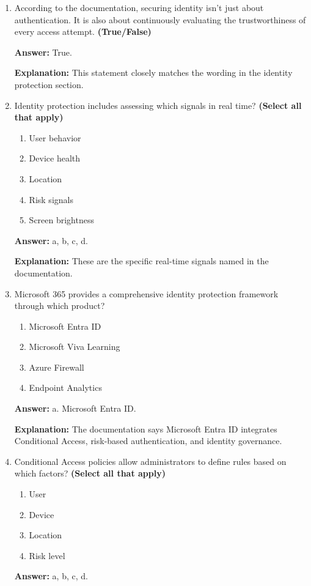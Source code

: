 \documentclass[10pt]{article}
\begin{document}
\begin{enumerate}[leftmargin=*]
\textbf{Explanation:} The documentation says early identity protection lays the groundwork for securing the remaining pillars while supporting agility and compliance.

\item According to the documentation, securing identity isn’t just about authentication. It is also about continuously evaluating the trustworthiness of every access attempt. \textbf{(True/False)}

\textbf{Answer:} True.

\textbf{Explanation:} This statement closely matches the wording in the identity protection section.

\item Identity protection includes assessing which signals in real time? \textbf{(Select all that apply)}
\begin{enumerate}[label=\alph*., leftmargin=1.5em]
\item User behavior
\item Device health
\item Location
\item Risk signals
\item Screen brightness
\end{enumerate}
\textbf{Answer:} a, b, c, d.

\textbf{Explanation:} These are the specific real-time signals named in the documentation.

\item Microsoft 365 provides a comprehensive identity protection framework through which product?
\begin{enumerate}[label=\alph*., leftmargin=1.5em]
\item Microsoft Entra ID
\item Microsoft Viva Learning
\item Azure Firewall
\item Endpoint Analytics
\end{enumerate}
\textbf{Answer:} a. Microsoft Entra ID.

\textbf{Explanation:} The documentation says Microsoft Entra ID integrates Conditional Access, risk-based authentication, and identity governance.

\item Conditional Access policies allow administrators to define rules based on which factors? \textbf{(Select all that apply)}
\begin{enumerate}[label=\alph*., leftmargin=1.5em]
\item User
\item Device
\item Location
\item Risk level
\end{enumerate}
\textbf{Answer:} a, b, c, d.


\end{enumerate}
\end{document}
